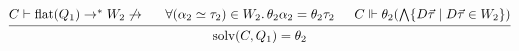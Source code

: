 \documentclass[12pt]{article}
\begin{document}
\pagestyle{empty}

\[
    \begin{prooftree}
        \hypo{C \vdash \mathrm{flat}(Q_1) \to^* W_2 \not\to {}}
        \hypo{\forall (\alpha_2 \simeq \tau_2) \in W_2\ldotp \theta_2\alpha_2 = \theta_2\tau_2}
        \hypo{C \Vdash \theta_2 (\bigwedge \{D \vec{\tau} \mid D \vec{\tau} \in W_2\})}
        \infer3{\mathrm{solv}(C, Q_1) = \theta_2}
    \end{prooftree}
\]
\end{document}
